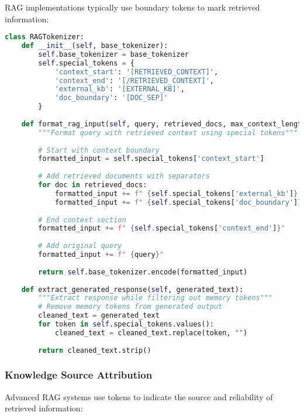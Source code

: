 RAG implementations typically use boundary tokens to mark retrieved information:

\begin{lstlisting}[language=Python, caption=RAG context token implementation]
class RAGTokenizer:
    def __init__(self, base_tokenizer):
        self.base_tokenizer = base_tokenizer
        self.special_tokens = {
            'context_start': '[RETRIEVED_CONTEXT]',
            'context_end': '[/RETRIEVED_CONTEXT]',
            'external_kb': '[EXTERNAL_KB]',
            'doc_boundary': '[DOC_SEP]'
        }
    
    def format_rag_input(self, query, retrieved_docs, max_context_length=512):
        """Format query with retrieved context using special tokens"""
        
        # Start with context boundary
        formatted_input = self.special_tokens['context_start']
        
        # Add retrieved documents with separators
        for doc in retrieved_docs:
            formatted_input += f" {self.special_tokens['external_kb']} {doc}"
            formatted_input += f" {self.special_tokens['doc_boundary']}"
        
        # End context section
        formatted_input += f" {self.special_tokens['context_end']}"
        
        # Add original query
        formatted_input += f" {query}"
        
        return self.base_tokenizer.encode(formatted_input)
    
    def extract_generated_response(self, generated_text):
        """Extract response while filtering out memory tokens"""
        # Remove memory tokens from generated output
        cleaned_text = generated_text
        for token in self.special_tokens.values():
            cleaned_text = cleaned_text.replace(token, "")
        
        return cleaned_text.strip()
\end{lstlisting}

\subsubsection{Knowledge Source Attribution}

Advanced RAG systems use tokens to indicate the source and reliability of retrieved information:

